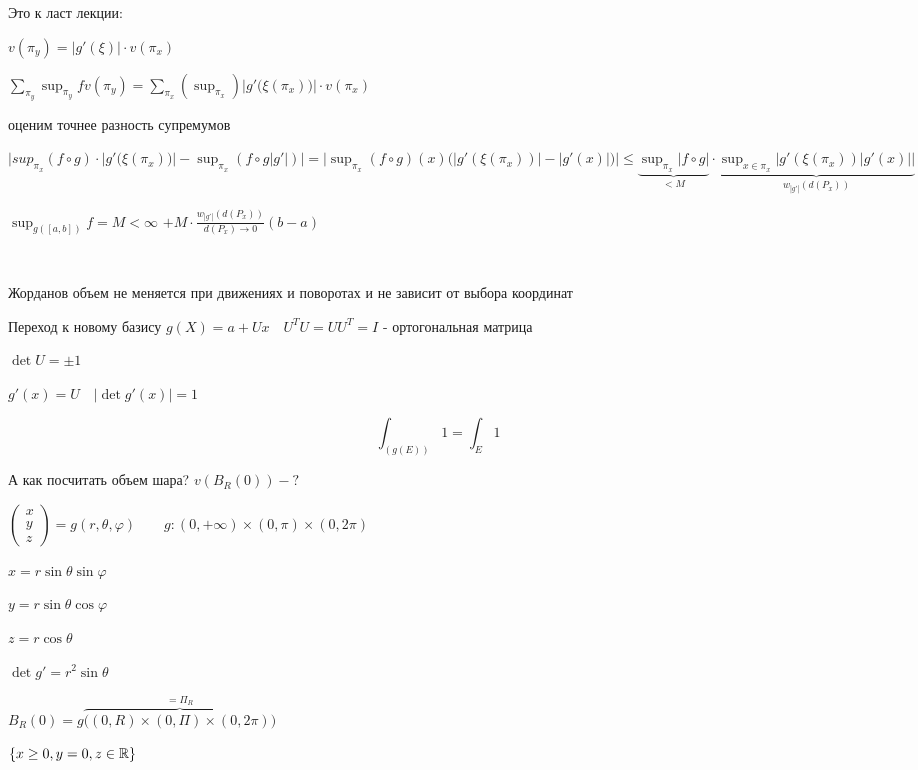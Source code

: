     Это к ласт лекции:

    $v(\pi_y) = |g'(\xi)| \cdot v(\pi_x)$

    $\sum_{\pi_y}\sup_{\pi_y} f v(\pi_y) = \sum_{\pi_x}(\sup_{\pi_x})\big|g'\big(\xi(\pi_x)\big)\big|\cdot v(\pi_x)$

    оценим точнее разность супремумов

    $\Big|sup_{\pi_x} (f\circ g)\cdot|g'\big(\xi(\pi_x)\big)| - \sup_{\pi_x}(f\circ g|g'|)\Big|=
    \Big|\sup_{\pi_x}(f\circ g)(x)\big(|g'(\xi(\pi_x))| - | g'(x) |\big) \Big| \le \underbrace{\sup_{\pi_x} |f\circ g|}_{<M}
    \cdot \underbrace{\sup_{x\in \pi_x} \big| g'(\xi(\pi_x))|g'(x)| \big|}_{w_{|g'|}(d(P_x))}
    $

    $\sup_{g([a,b])} f = M < \infty$ \quad $+ M \cdot \frac{w_{|g'|}(d(P_x))}{d(P_x)\to 0}(b-a)$  %

    \par $ $

    \begin{corollary}
        Жорданов объем не меняется при движениях и поворотах и не зависит от выбора координат

        Переход к новому базису $g(X) = a + Ux \quad U^TU = UU^T = I$ - ортогональная матрица

        $\det U = \pm 1$

        $g'(x) = U \quad |\det g'(x)| = 1$

        $$\int_{(g(E))} 1 = \int_E 1$$
    \end{corollary}

    А как посчитать объем шара? $v(B_R(0)) - ?$

    $\left(\begin{smallmatrix}
        x \\ y \\ z
    \end{smallmatrix}\right) = g(r, \theta, \varphi) \qquad g: (0, +\infty)\times(0, \pi)\times(0, 2\pi)$

    $x = r\sin\theta\sin\varphi$  %

    $y = r\sin\theta\cos\varphi$  %

    $z = r\cos\theta$

    $\det g' = r^2 \sin\theta$
    
    $B_R(0) = g\overbrace{\big((0, R)\times(0, \Pi)\times(0,2\pi)\big)}^{=\Pi_R}$

    $\{ x \ge 0, y = 0, z \in \mathbb{R} \}$

